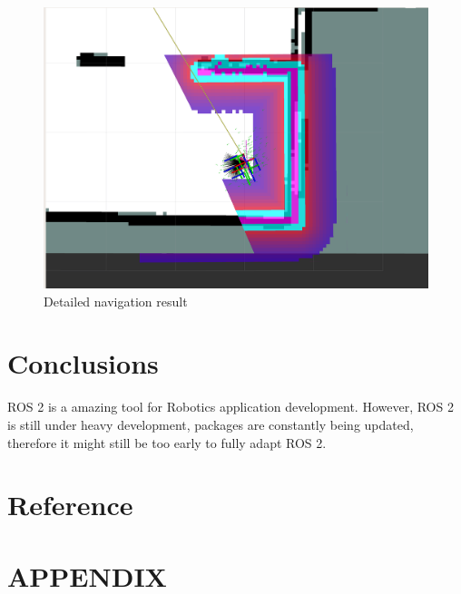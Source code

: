 \documentclass[letterpaper, 10 pt, conference]{ieeeconf}  %
\begin{document}
\begin{figure}[ht]
  \includegraphics[width=\linewidth]{navigation_detail.png}
  \caption{Detailed navigation result} 
  \label{fig:navigation_detail}
\end{figure}{}
\section{Conclusions}\label{conclusions}
ROS 2 is a amazing tool for Robotics application development. However, ROS 2 is still under heavy development, packages are constantly being updated, therefore it might still be too early to fully adapt ROS 2. 
\section{Reference}\label{reference}
\addtolength{\textheight}{-12cm}   %
\section*{APPENDIX}
\end{document}

